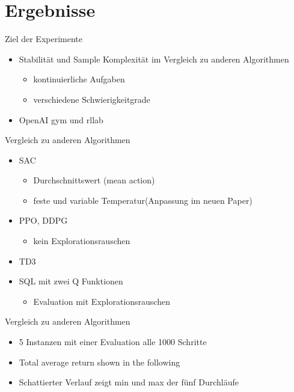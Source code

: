 \section{Ergebnisse}

\begin{frame}{Ziel der Experimente}
        \begin{itemize}
            \item Stabilität und Sample Komplexität im Vergleich zu anderen Algorithmen
            \begin{itemize}
                \item kontinuierliche Aufgaben
                \item verschiedene Schwierigkeitgrade
            \end{itemize}  
            \item OpenAI gym und rllab
        \end{itemize}
\end{frame}

\begin{frame}{Vergleich zu anderen Algorithmen}
    \begin{itemize}
        \item SAC
        \begin{itemize}
            \item Durchschnittswert (mean action)
            \item feste und variable Temperatur(Anpassung im neuen Paper)
        \end{itemize} 
        \item PPO, DDPG
        \begin{itemize}
            \item kein Explorationsrauschen
        \end{itemize}
        \item TD3
        \item SQL mit zwei Q Funktionen
        \begin{itemize}
            \item Evaluation mit Explorationsrauschen        
        \end{itemize}
    \end{itemize}
\end{frame}

\begin{frame}{Vergleich zu anderen Algorithmen}
    \begin{itemize}     
        \item 5 Instanzen mit einer Evaluation alle 1000 Schritte
        \item Total average return shown in the following
        \item Schattierter Verlauf zeigt min und max der fünf Durchläufe
        
    \end{itemize}
    
\end{frame}

